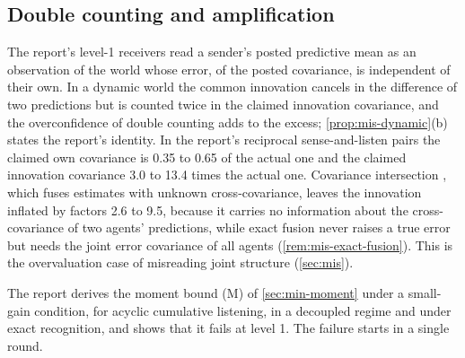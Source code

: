 \subsection{Double counting and amplification}\label{sup:min-double-counting-and-amplification}

The report's level-1 receivers read a sender's posted predictive mean as an observation of the world whose error, of the posted covariance, is independent of their own. In a dynamic world the common innovation cancels in the difference of two predictions but is counted twice in the claimed innovation covariance, and the overconfidence of double counting adds to the excess; \cref{prop:mis-dynamic}(b) states the report's identity. In the report's reciprocal sense-and-listen pairs the claimed own covariance is 0.35 to 0.65 of the actual one and the claimed innovation covariance 3.0 to 13.4 times the actual one. Covariance intersection \citep{julier1997nondivergent}, which fuses estimates with unknown cross-covariance, leaves the innovation inflated by factors 2.6 to 9.5, because it carries no information about the cross-covariance of two agents' predictions, while exact fusion never raises a true error but needs the joint error covariance of all agents (\cref{rem:mis-exact-fusion}). This is the overvaluation case of misreading joint structure (\cref{sec:mis}).

The report derives the moment bound (M) of \cref{sec:min-moment} under a small-gain condition, for acyclic cumulative listening, in a decoupled regime and under exact recognition, and shows that it fails at level 1. The failure starts in a single round.

